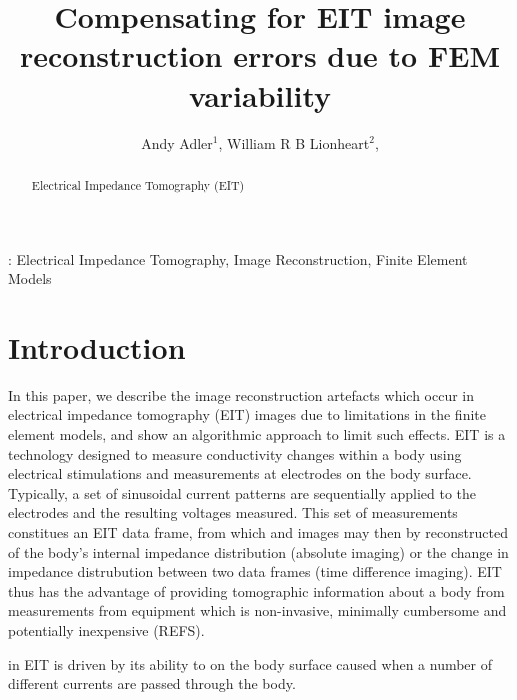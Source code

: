 \documentclass[12pt,draft]{iopart}
\begin{document}
\title[FEM variability and EIT images]{%
 Compensating for EIT image reconstruction errors due to 
   FEM variability 
}

\author{Andy Adler$^{1}$,
        William R B Lionheart$^{2}$,
       }

\address{ $^{1}$Systems and Computer Engineering,
                Carleton University, Ottawa, Canada}
\address{$^{13}$School of Mathematics, University of Manchester, UK}



\begin{abstract}
Electrical Impedance Tomography (EIT)
\end{abstract}

:
Electrical Impedance Tomography,
Image Reconstruction,
Finite Element Models

\section{Introduction}
In this paper, we describe the image reconstruction artefacts
which occur in electrical impedance tomography (EIT) images
due to limitations in the finite element models, and show
an algorithmic approach to limit such effects.
%
EIT is a technology designed to measure conductivity
changes within a body using electrical stimulations and
measurements at electrodes on the body surface. Typically,
a set of sinusoidal current patterns are sequentially applied to
the electrodes and the resulting voltages measured. This
set of measurements constitues an EIT data frame, from which
and images may then by reconstructed of the body's internal impedance
distribution (absolute imaging) or the change in impedance distrubution
between two data frames (time difference imaging). EIT thus has
the advantage of providing tomographic information about a body
from measurements from equipment which is non-invasive, minimally
cumbersome and potentially inexpensive (REFS).

in EIT is driven by its ability to 
on the body surface caused when a number of different
currents are passed through the body.
\end{document}
